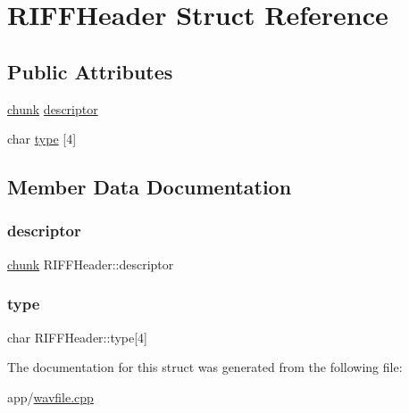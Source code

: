 \hypertarget{struct_r_i_f_f_header}{}\section{R\+I\+F\+F\+Header Struct Reference}
\label{struct_r_i_f_f_header}
\subsection*{Public Attributes}
\begin{DoxyCompactItemize}
\item 
\hyperlink{structchunk}{chunk} \hyperlink{struct_r_i_f_f_header_a3576246914fcd14ee6edeb9625e7074e}{descriptor}
\item 
char \hyperlink{struct_r_i_f_f_header_a2bc63e3bed286dd8216ee2542e729d03}{type} \mbox{[}4\mbox{]}
\end{DoxyCompactItemize}


\subsection{Member Data Documentation}
\hypertarget{struct_r_i_f_f_header_a3576246914fcd14ee6edeb9625e7074e}{}\label{struct_r_i_f_f_header_a3576246914fcd14ee6edeb9625e7074e} 
\subsubsection{\texorpdfstring{descriptor}{descriptor}}
{\footnotesize\ttfamily \hyperlink{structchunk}{chunk} R\+I\+F\+F\+Header\+::descriptor}

\hypertarget{struct_r_i_f_f_header_a2bc63e3bed286dd8216ee2542e729d03}{}\label{struct_r_i_f_f_header_a2bc63e3bed286dd8216ee2542e729d03} 
\subsubsection{\texorpdfstring{type}{type}}
{\footnotesize\ttfamily char R\+I\+F\+F\+Header\+::type\mbox{[}4\mbox{]}}



The documentation for this struct was generated from the following file\+:\begin{DoxyCompactItemize}
\item 
app/\hyperlink{wavfile_8cpp}{wavfile.\+cpp}\end{DoxyCompactItemize}
